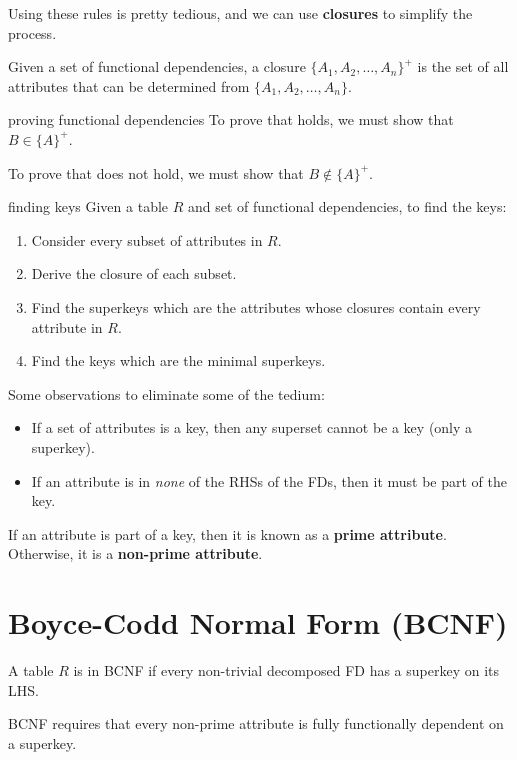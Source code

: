 Using these rules is pretty tedious, and we can use \textbf{closures} to simplify the process.

Given a set of functional dependencies, a closure $\{A_1, A_2, \dots, A_n\}^+$ is the set of all attributes that can be determined from $\{A_1, A_2, \dots, A_n\}$.

\begin{defn}{proving functional dependencies }
    To prove that  holds, we must show that $B \in \{A\}^+$.

    To prove that  does not hold, we must show that $B \notin \{A\}^+$.
\end{defn}

\begin{defn}{finding keys}
    Given a table $R$ and set of functional dependencies, to find the keys:
    \begin{enumerate}
        \item Consider every subset of attributes in $R$.
        \item Derive the closure of each subset.
        \item Find the superkeys which are the attributes whose closures contain every attribute in $R$.
        \item Find the keys which are the minimal superkeys.
    \end{enumerate}

    Some observations to eliminate some of the tedium:
    \begin{itemize}
        \item If a set of attributes is a key, then any superset cannot be a key (only a superkey).
        \item If an attribute is in \textit{none} of the RHSs of the FDs, then it must be part of the key.
    \end{itemize}
\end{defn}

If an attribute is part of a key, then it is known as a \textbf{prime attribute}.
Otherwise, it is a \textbf{non-prime attribute}.


\section{Boyce-Codd Normal Form (BCNF)}
A table $R$ is in BCNF if every non-trivial decomposed FD has a superkey on its LHS.

BCNF requires that every non-prime attribute is fully functionally dependent on a superkey.


